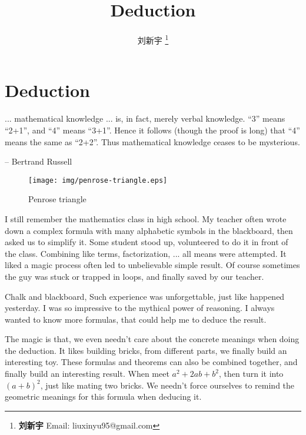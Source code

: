 \documentclass{article}
\begin{document}
\title{Deduction}

\author{刘新宇
\thanks{{\bfseries 刘新宇} \newline
  Email: liuxinyu95@gmail.com \newline}
  }

\maketitle
\fi


\ifx\wholebook\relax
\chapter{Deduction}
\fi

\epigraph{... mathematical knowledge ... is, in fact, merely verbal knowledge. ``3'' means ``2+1'', and ``4'' means ``3+1''. Hence it follows (though the proof is long) that ``4'' means the same as ``2+2''. Thus mathematical knowledge ceases to be mysterious.}{-- Bertrand Russell}

\begin{wrapfigure}{R}{0.4\textwidth}
 \centering
 \texttt{[image: img/penrose-triangle.eps]}
 \captionsetup{labelformat=empty}
 \caption{Penrose triangle}
 \label{fig:Penrose-triangle}
\end{wrapfigure}

I still remember the mathematics class in high school. My teacher often wrote down a complex formula with many alphabetic symbols in the blackboard, then asked us to simplify it. Some student stood up, volunteered to do it in front of the class. Combining like terms, factorization, ... all means were attempted. It liked a magic process often led to unbelievable simple result. Of course sometimes the guy was stuck or trapped in loops, and finally saved by our teacher.

Chalk and blackboard, Such experience was unforgettable, just like happened yesterday. I was so impressive to the mythical power of reasoning. I always wanted to know more formulas, that could help me to deduce the result.

The magic is that, we even needn't care about the concrete meanings when doing the deduction. It likes building bricks, from different parts, we finally build an interesting toy. These formulas and theorems can also be combined together, and finally build an interesting result. When meet $a^2 + 2ab + b^2$, then turn it into $(a+b)^2$, just like mating two bricks. We needn't force ourselves to remind the geometric meanings for this formula when deducing it.
\end{document}
